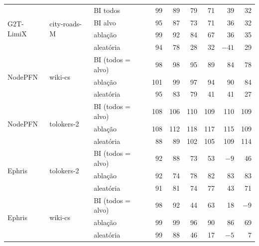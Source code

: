 \documentclass[12pt,a4paper]{article}
\newcommand{\ruim}[1]{\textcolor{red!70!black}{#1}}
\begin{document}
\begin{table}[H]
{\begin{tabular}{@{}lllrrrrrr@{}}
\midrule
\multirow{4}{*}{G2T-LimiX} & \multirow{4}{*}{city-roads-M}
  & BI todos  & 99 & 89 & 79 & 71 & 39 & 32 \\
 & & BI alvo  & 95 & 87 & 73 & 71 & 36 & 32 \\
 & & ablação  & 99 & 92 & 84 & 67 & 36 & 35 \\
 & & aleatória & 94 & 78 & 28 & 32 & $-41$ & 29 \\
\midrule
\multirow{3}{*}{NodePFN} & \multirow{3}{*}{wiki-cs}
  & BI (todos = alvo) & 98 & 98 & 95 & 89 & 84 & 78 \\
 & & ablação  & 101 & 99 & 97 & 94 & 90 & 84 \\
 & & aleatória & 95 & 83 & 79 & 41 & 41 & 27 \\
\midrule
\multirow{3}{*}{NodePFN} & \multirow{3}{*}{tolokers-2}
  & BI (todos = alvo) & 108 & 106 & 110 & 109 & 110 & 109 \\
 & & ablação  & 108 & 112 & 118 & 117 & 115 & 109 \\
 & & aleatória & 88 & 89 & 102 & 105 & 109 & 114 \\
\midrule
\multirow{3}{*}{Ephris} & \multirow{3}{*}{tolokers-2}
  & BI (todos = alvo) & 92 & 88 & 73 & 53 & \ruim{$-9$} & 46 \\
 & & ablação  & 92 & 74 & 78 & 82 & 83 & 83 \\
 & & aleatória & 91 & 81 & 74 & 77 & 43 & 71 \\
\midrule
\multirow{3}{*}{Ephris} & \multirow{3}{*}{wiki-cs}
  & BI (todos = alvo) & 98 & 92 & 44 & 63 & 18 & $-9$ \\
 & & ablação  & 99 & 99 & 96 & 90 & 86 & 69 \\
 & & aleatória & 99 & 88 & 46 & 17 & $-5$ & 7 \\
\bottomrule
\end{tabular}}
\end{table}
\end{document}

